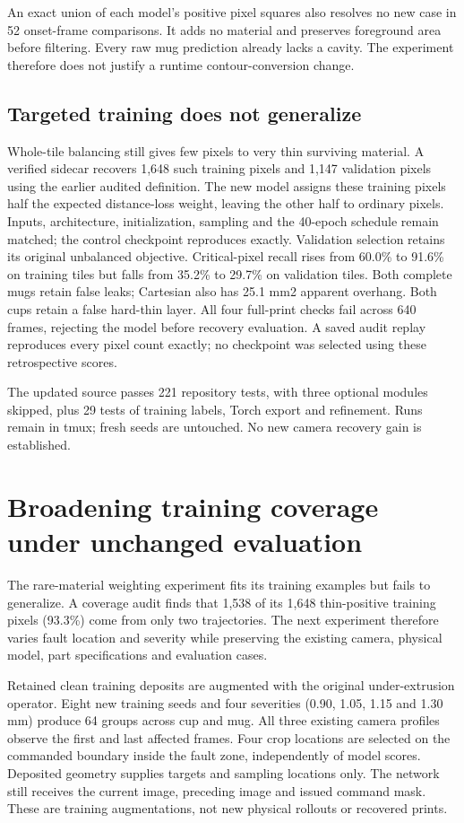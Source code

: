\documentclass[10pt,letterpaper]{article}
\begin{document}
An exact union of each model's positive pixel squares also resolves no new case
in 52 onset-frame comparisons. It adds no material and preserves foreground
area before filtering. Every raw mug prediction already lacks a cavity. The
experiment therefore does not justify a runtime contour-conversion change.

\subsection*{Targeted training does not generalize}
Whole-tile balancing still gives few pixels to very thin surviving material.
A verified sidecar recovers 1,648 such training pixels and 1,147 validation pixels
using the earlier audited definition. The new model assigns these training
pixels half the expected distance-loss weight, leaving the other half to ordinary
pixels. Inputs, architecture, initialization, sampling and the 40-epoch schedule
remain matched; the control checkpoint reproduces exactly. Validation selection
retains its original unbalanced objective. Critical-pixel recall rises from
60.0\% to 91.6\% on training tiles but falls from 35.2\% to 29.7\% on validation
tiles. Both complete mugs retain false leaks; Cartesian also has 25.1 mm2
apparent overhang. Both cups retain a false hard-thin layer. All four full-print
checks fail across 640 frames, rejecting the model before recovery evaluation.
A saved audit replay reproduces every pixel
count exactly; no checkpoint was selected using these retrospective scores.

The updated source passes 221 repository tests, with three optional modules
skipped, plus 29 tests of training labels, Torch export and refinement. Runs remain in tmux;
fresh seeds are untouched. No new camera recovery gain is established.

\newpage
\section{Broadening training coverage under unchanged evaluation}
The rare-material weighting experiment fits its training examples but fails to
generalize. A coverage audit finds that 1,538 of its 1,648 thin-positive training
pixels (93.3\%) come from only two trajectories. The next experiment therefore
varies fault location and severity while preserving the existing camera,
physical model, part specifications and evaluation cases.

Retained clean training deposits are augmented with the original under-extrusion
operator. Eight new training seeds and four severities (0.90, 1.05, 1.15 and
1.30 mm) produce 64 groups across cup and mug. All three existing camera profiles
observe the first and last affected frames. Four crop locations are selected on
the commanded boundary inside the fault zone, independently of model scores.
Deposited geometry supplies targets and sampling locations only. The network
still receives the current image, preceding image and issued command mask.
These are training augmentations, not new physical rollouts or recovered prints.
\end{document}

